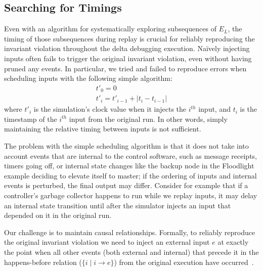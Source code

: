 \subsection{Searching for Timings}
\label{subsec:replay}

Even with an algorithm for systematically exploring subsequences of $E_L$, the
timing of those subsequences during replay is crucial for reliably
reproducing the
invariant violation throughout the delta debugging execution. Na\"ively injecting inputs often fails to
trigger the original invariant violation, even without having pruned any
events. In particular, we tried and failed to reproduce errors when scheduling inputs
with the following simple algorithm:
\begin{align*}
t'_0 = 0 \\
t'_i = t'_{i-1} + |t_{i} - t_{i-1}|
\end{align*}
where $t'_i$ is the simulation's clock value when it injects the $i^{th}$ input, and $t_i$ is
the timestamp of the $i^{th}$ input from the original run. In other words, simply
maintaining the relative timing between inputs is not sufficient.

The problem with the simple scheduling algorithm is that it does not take into
account events that are internal to the control software, such as
message receipts, timers going off, or internal state
changes like the backup node in the Floodlight example deciding to elevate
itself to master; if the ordering of inputs and internal events is
perturbed, the final output may differ.
Consider for example that if a controller's garbage collector happens to run
while we replay inputs, it may delay an internal state transition until
after the simulator injects an input that depended on it in the original run.

Our challenge is to maintain causal relationships.
Formally, to reliably reproduce the original invariant violation
we need to
inject an external input $e$ at exactly the point when all other
events (both external and internal) that precede it in the happens-before
relation ($\{i \mid i \rightarrow e\}$) from the original execution have
occurred~\cite{tel2000introduction}.


